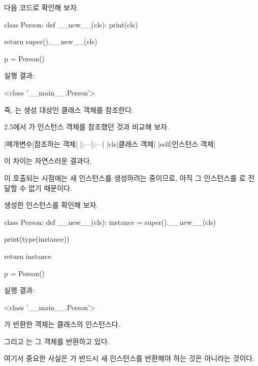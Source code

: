 다음 코드로 확인해 보자.

\begin{dhkcode}
class Person:
    def __new__(cls):
        print(cls)

        return super().__new__(cls)

p = Person()
\end{dhkcode}

실행 결과:

\begin{dhkzsh}
<class '__main__.Person'>
\end{dhkzsh}

즉, 는 생성 대상인  클래스 객체를 참조한다.

2.5에서 가 인스턴스 객체를 참조했던 것과 비교해 보자.

\begin{dhktable}
|매개변수|참조하는 객체|
|:---|:---|
|cls|클래스 객체|
|self|인스턴스 객체|
\end{dhktable}

이 차이는 자연스러운 결과다.

이 호출되는 시점에는 새 인스턴스를 생성하려는 중이므로, 아직 그 인스턴스를 로 전달할 수 없기 때문이다.

\begin{dhknote}
\begin{dhksmry}[centered]
생성한 인스턴스를 확인해 보자.
\end{dhksmry}
\end{dhknote}

\begin{dhkcode}
class Person:
    def __new__(cls):
        instance = super().__new__(cls)

        print(type(instance))

        return instance

p = Person()
\end{dhkcode}

실행 결과:

\begin{dhkzsh}
<class '__main__.Person'>
\end{dhkzsh}

가 반환한 객체는  클래스의 인스턴스다.

그리고 는 그 객체를 반환하고 있다.

여기서 중요한 사실은 가 반드시 새 인스턴스를 반환해야 하는 것은 아니라는 것이다.

